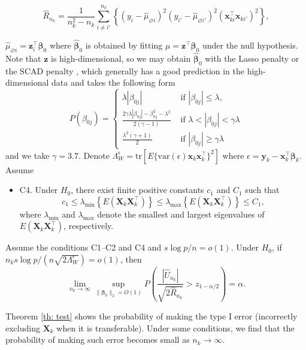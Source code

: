 \documentclass[twoside,12pt]{article}
\newcommand{\mb}[1]{\boldsymbol{\mathbf{#1}}}
\newcommand{\wh}[1]{\widehat{#1}}
\begin{document}
$$\hat{R}_{n_k}=\frac{1}{n_k^2-n_k} \sum_{i \neq i'}^{n_k}\left\{\left(y_i-\hat{\mu}_{\varnothing i}\right)^2\left(y_{i'}-\hat{\mu}_{\varnothing i'}\right)^2\left(\mb x_{ki}^\top \mb x_{ki'}\right)^2\right\},$$

$\hat{\mu}_{\varnothing i}=\mb z_{i}^\top \wh{\mb\beta}_0$ where $\wh{\mb\beta}_0$ is obtained by fitting $\mu=\mb z^\top\mb\beta_0$ under the null hypothesis.
Note that $\mb z$ is high-dimensional, so we may obtain $\wh{\mb\beta}_0$ with the Lasso penalty or the SCAD penalty \citep{FanLi}, which generally has a good prediction in the high-dimensional data and takes the following form 
\begin{equation*}
	P(\beta_{0j})= \begin{cases}\lambda|\beta_{0j}| & \text { if }|\beta_{0j}| \leq \lambda, \\ \frac{2 \gamma \lambda|\beta_{0j}|-\beta_{0j}^{2}-\lambda^{2}}{2(\gamma-1)} & \text { if } \lambda<|\beta_{0j}|<\gamma \lambda \\ \frac{\lambda^{2}(\gamma+1)}{2} & \text { if }|\beta_{0j}| \geq \gamma \lambda\end{cases}
\end{equation*}
and we take $\gamma=3.7$.
Denote $\Lambda_W^{\epsilon}=\text{tr}[E\{\text{var}(\epsilon)\mb x_k\mb x_k^\top\}^2]$ where $\epsilon=\mb y_k-\mb x_k^\top \mb\beta_k$.
Assume
\begin{itemize}
\item C4. Under $H_0$, there exist finite positive constants $c_1$ and $C_1$ such that 
$$c_1\leq \lambda_{\text{min}}\left\{E(\mb X_k\mb X_k^\top)\right\}\leq \lambda_{\text{max}}\left\{E(\mb X_k\mb X_k^\top)\right\}\leq C_1,$$
where $\lambda_{\text{min}}$ and $\lambda_{\text{max}}$ denote the smallest and largest eigenvalues of $E(\mb X_k\mb X_k^\top)$, respectively. 
\end{itemize}


\begin{theorem}
\label{th: test}
Assume the conditions C1--C2 and C4 and $s\log p/n=o(1)$.
Under $H_0$, if $n_k s\log p/(n \sqrt{2\Lambda_W^{\epsilon}})=o(1)$, then
$$\lim_{n_k\rightarrow\infty} \sup_{\|\mb\beta_0\|_2=O(1)}P\left(\frac{|\hat{U}_{n_k}|}{\sqrt{2\hat R_{n_k}}}>z_{1-\alpha/2}\right)=\alpha.$$
\end{theorem}


Theorem \ref{th: test} shows the probability of making the type I error (incorrectly excluding $\mb X_k$ when it is transferable).
Under some conditions, we find that the probability of making such error becomes small as $n_k\rightarrow\infty$.
\end{document}
